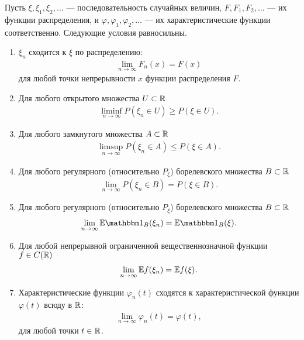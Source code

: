 \documentclass[../main.tex]{subfiles}
\begin{document}
\begin{thm}
 \label{theorem:weak_convergence}
 Пусть $ \xi, \xi_1, \xi_2, \ldots $ --- последовательность случайных величин, $ F, F_1, F_2, \ldots $ --- их функции распределения, и $ \varphi, \varphi_1, \varphi_2, \ldots $ --- их характеристические функции соответственно. Следующие условия равносильны.
 \begin{enumerate}
  \item \label{i1:weak_convergence} $ \xi_n $ сходится к $ \xi $ по распределению:
   \begin{align*}
    \lim_{n \to \infty} F_n(x) = F(x)
   \end{align*} для любой точки непрерывности $ x $ функции распределения $ F $.
  \item \label{i2:weak_convergence} Для любого открытого множества $ U \subset \mathbb{R} $
   \begin{align*}
    \liminf_{n \to \infty} P(\xi_n \in U) \geqslant P(\xi \in U).
   \end{align*}
  \item \label{i3:weak_convergence} Для любого замкнутого множества $ A \subset \mathbb{R} $
   \begin{align*}
    \limsup_{n \to \infty} P(\xi_n \in A) \leqslant P(\xi \in A).
   \end{align*}
  \item \label{i4:weak_convergence} Для любого регулярного (относительно $ P_\xi $) борелевского множества $ B \subset \mathbb{R}$
   \begin{align*}
    \lim_{n \to \infty} P(\xi_n \in B) = P(\xi \in B).
   \end{align*}
  \item \label{i5:weak_convergence} Для любого регулярного (относительно $ P_\xi $) борелевского множества $ B \subset\mathbb{R} $
   \begin{align*}
    \lim_{n \to \infty} \E \Ind_B(\xi_n) = \E \Ind_B(\xi).
   \end{align*}
  \item \label{i6:weak_convergence} Для любой непрерывной ограниченной вещественнозначной функции $ f \in C(\mathbb{R}) $
   \begin{align*}
    \lim_{n \to \infty} \mathbb E f(\xi_n) = \mathbb E f(\xi).
   \end{align*}
  \item \label{i7:weak_convergence} Характеристические функции $ \varphi_n(t) $ сходятся к характеристической функции $ \varphi(t) $ всюду в $ \mathbb{R} $:
   \begin{align*}
    \lim_{n \to \infty} \varphi_n(t) = \varphi(t),
   \end{align*} для любой точки $ t \in \mathbb{R} $.
 \end{enumerate}
\end{thm}
\end{document}
